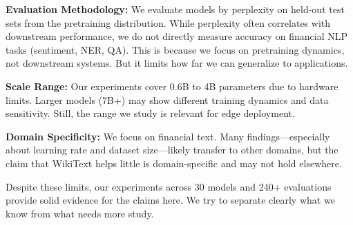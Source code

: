\textbf{Evaluation Methodology:} We evaluate models by perplexity on held-out test sets from the pretraining distribution. While perplexity often correlates with downstream performance, we do not directly measure accuracy on financial NLP tasks (sentiment, NER, QA). This is because we focus on pretraining dynamics, not downstream systems. But it limits how far we can generalize to applications.

\textbf{Scale Range:} Our experiments cover 0.6B to 4B parameters due to hardware limits. Larger models (7B+) may show different training dynamics and data sensitivity. Still, the range we study is relevant for edge deployment.

\textbf{Domain Specificity:} We focus on financial text. Many findings—especially about learning rate and dataset size—likely transfer to other domains, but the claim that WikiText helps little is domain-specific and may not hold elsewhere.

Despite these limits, our experiments across 30 models and 240+ evaluations provide solid evidence for the claims here. We try to separate clearly what we know from what needs more study.
